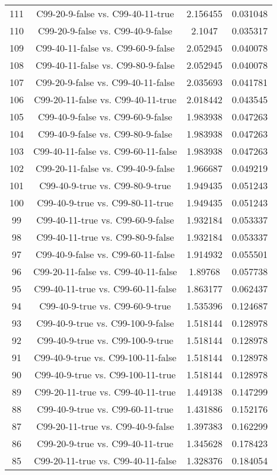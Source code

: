 \documentclass[a4paper,10pt]{article}
\begin{document}
\begin{landscape}
\begin{table}[!htp]
\begin{tabular}{cccc}
111&C99-20-9-false vs. C99-40-11-true&2.156455&0.031048\\
110&C99-20-9-false vs. C99-40-9-false&2.1047&0.035317\\
109&C99-40-11-false vs. C99-60-9-false&2.052945&0.040078\\
108&C99-40-11-false vs. C99-80-9-false&2.052945&0.040078\\
107&C99-20-9-false vs. C99-40-11-false&2.035693&0.041781\\
106&C99-20-11-false vs. C99-40-11-true&2.018442&0.043545\\
105&C99-40-9-false vs. C99-60-9-false&1.983938&0.047263\\
104&C99-40-9-false vs. C99-80-9-false&1.983938&0.047263\\
103&C99-40-11-false vs. C99-60-11-false&1.983938&0.047263\\
102&C99-20-11-false vs. C99-40-9-false&1.966687&0.049219\\
101&C99-40-9-true vs. C99-80-9-true&1.949435&0.051243\\
100&C99-40-9-true vs. C99-80-11-true&1.949435&0.051243\\
99&C99-40-11-true vs. C99-60-9-false&1.932184&0.053337\\
98&C99-40-11-true vs. C99-80-9-false&1.932184&0.053337\\
97&C99-40-9-false vs. C99-60-11-false&1.914932&0.055501\\
96&C99-20-11-false vs. C99-40-11-false&1.89768&0.057738\\
95&C99-40-11-true vs. C99-60-11-false&1.863177&0.062437\\
94&C99-40-9-true vs. C99-60-9-true&1.535396&0.124687\\
93&C99-40-9-true vs. C99-100-9-false&1.518144&0.128978\\
92&C99-40-9-true vs. C99-100-9-true&1.518144&0.128978\\
91&C99-40-9-true vs. C99-100-11-false&1.518144&0.128978\\
90&C99-40-9-true vs. C99-100-11-true&1.518144&0.128978\\
89&C99-20-11-true vs. C99-40-11-true&1.449138&0.147299\\
88&C99-40-9-true vs. C99-60-11-true&1.431886&0.152176\\
87&C99-20-11-true vs. C99-40-9-false&1.397383&0.162299\\
86&C99-20-9-true vs. C99-40-11-true&1.345628&0.178423\\
85&C99-20-11-true vs. C99-40-11-false&1.328376&0.184054\\

\end{tabular}
\end{table}
\end{landscape}
\end{document}
